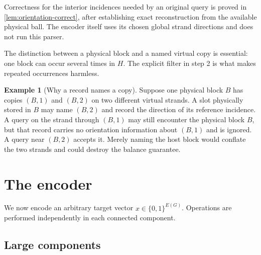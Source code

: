 \documentclass[11pt]{article}
\theoremstyle{definition}
\newtheorem{example}[theorem]{Example}
\theoremstyle{remark}
\newcommand{\bits}{\{0,1\}}
\begin{document}
Correctness for the interior incidences needed by an original query is proved
in \cref{lem:orientation-correct}, after establishing exact reconstruction
from the available physical ball.  The encoder itself uses its chosen
global strand directions and does not run this parser.

The distinction between a physical block and a named virtual copy is
essential: one block can occur several times in $H$.  The explicit filter in
step 2 is what makes repeated occurrences harmless.

\begin{example}[Why a record names a copy]
Suppose one physical block $B$ has copies $(B,1)$ and $(B,2)$ on two different
virtual strands.  A slot physically stored in $B$ may name $(B,2)$ and record
the direction of its reference incidence.  A query on the strand through
$(B,1)$ may still encounter the physical block $B$, but that record carries
no orientation information about $(B,1)$ and is ignored.  A query near
$(B,2)$ accepts it.  Merely naming the host block would conflate the two
strands and could destroy the balance guarantee.
\end{example}

\section{The encoder}
\label{sec:encoder}

We now encode an arbitrary target vector $x\in\bits^{E(G)}$.  Operations are
performed independently in each connected component.

\subsection{Large components}
\end{document}
